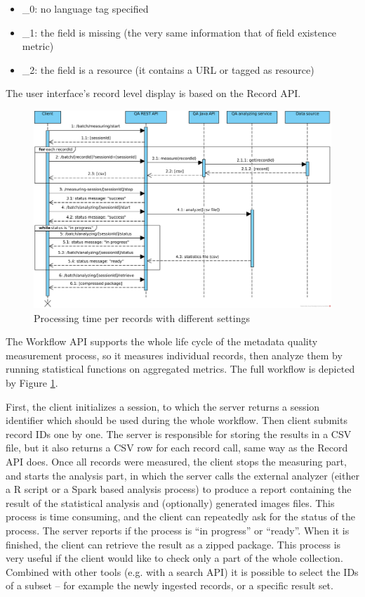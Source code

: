 \begin{itemize}
  \setlength{\parskip}{0pt}
  \setlength{\itemsep}{0pt plus 1pt}
  \item \_0: no language tag specified
  \item \_1: the field is missing (the very same information that of field existence metric)
  \item \_2: the field is a resource (it contains a URL or tagged as resource)
\end{itemize}

The user interface's record level display is based on the Record API.

\begin{figure}
\includegraphics[width=\textwidth]{images/chapter05/QA-REST-API-interactions.png}
\caption{Processing time per records with different settings}
\label{figure:workflow-api}
\end{figure}

The Workflow API supports the whole life cycle of the metadata quality measurement process, so it measures individual records, then analyze them by running statistical functions on aggregated metrics. The full workflow is depicted by Figure \ref{figure:workflow-api}. 

First, the client initializes a session, to which the server returns a session identifier which should be used during the whole workflow. Then client submits record IDs one by one. The server is responsible for storing the results in a CSV file, but it also returns a CSV row for each record call, same way as the Record API does. Once all records were measured, the client stops the measuring part, and starts the analysis part, in which the server calls the external analyzer (either a R script or a Spark based analysis process) to produce a report containing the result of the statistical analysis and (optionally) generated images files. This process is time consuming, and the client can repeatedly ask for the status of the process. The server reports if the process is ``in progress'' or ``ready''. When it is finished, the client can retrieve the result as a zipped package. This process is very useful if the client would like to check only a part of the whole collection. Combined with other tools (e.g. with a search API) it is possible to select the IDs of a subset -- for example the newly ingested records, or a specific result set.

